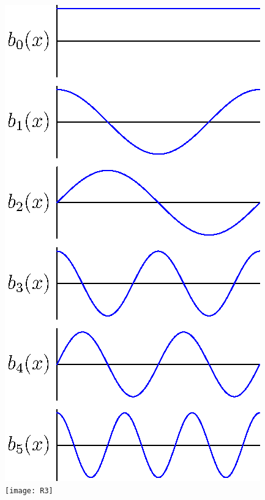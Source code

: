 \begin{slide}
\begin{PauseHighLight}
\begin{minipage}{0.23\linewidth}
\begin{center}
      \includegraphics[width=0.9\linewidth]{fourier}\\
      \vspace*{1cm}
      \texttt{[image: R3]}
    \end{center}
  \end{minipage}
\end{PauseHighLight}

\end{slide}




